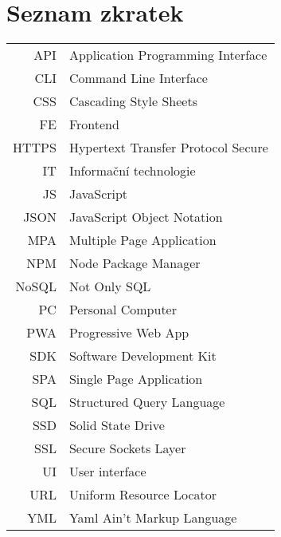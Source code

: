 
\chapter{Seznam zkratek}

\begin{tabular}{rl}
    API     & Application Programming Interface \\
    CLI     & Command Line Interface \\
    CSS     & Cascading Style Sheets \\
    FE      & Frontend \\
    HTTPS   & Hypertext Transfer Protocol Secure \\
    IT      & Informační technologie \\
    JS      & JavaScript \\
    JSON    & JavaScript Object Notation \\
    MPA     & Multiple Page Application \\
    NPM     & Node Package Manager \\
    NoSQL   & Not Only SQL \\
    PC      & Personal Computer \\
    PWA     & Progressive Web App \\
    SDK     & Software Development Kit \\
    SPA     & Single Page Application \\
    SQL     & Structured Query Language \\
    SSD     & Solid State Drive \\
    SSL     & Secure Sockets Layer \\
    UI      & User interface \\
    URL     & Uniform Resource Locator \\
    YML     & Yaml Ain't Markup Language \\
\end{tabular}
